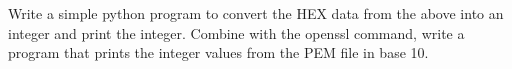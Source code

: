   Write a simple python program to convert the HEX data
  from the above into an integer and print the integer.
  Combine with the openssl command, write a program
  that prints the integer values from the PEM file
  in base 10.
